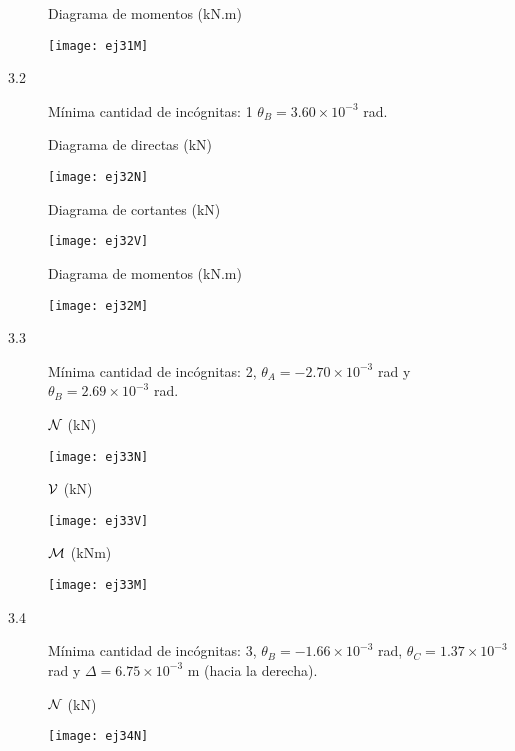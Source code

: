 \begin{description}
Diagrama de momentos (kN.m)

	\begin{center}
	\texttt{[image: ej31M]}
\end{center}

\item[3.2]
Mínima cantidad de incógnitas: 1 $\theta_B = 3.60 \times 10^{-3}$ rad.

Diagrama de directas (kN)

	\begin{center}
	\texttt{[image: ej32N]}
\end{center}

Diagrama de cortantes (kN)

	\begin{center}
	\texttt{[image: ej32V]}
\end{center}

Diagrama de momentos (kN.m)

	\begin{center}
	\texttt{[image: ej32M]}
\end{center}

\item [3.3]

Mínima cantidad de incógnitas: 2, $\theta_A = -2.70 \times 10^{-3}$ rad y $\theta_B = 2.69 \times 10^{-3}$ rad.

${\mathcal N}$ (kN)

	\begin{center}
	\texttt{[image: ej33N]}
\end{center}

${\mathcal V}$ (kN)

	\begin{center}
	\texttt{[image: ej33V]}
\end{center}

${\mathcal M}$ (kNm)

	\begin{center}
	\texttt{[image: ej33M]}
\end{center}

\item[3.4]
Mínima cantidad de incógnitas: 3, $\theta_B = -1.66 \times 10^{-3}$ rad, $\theta_C = 1.37 \times 10^{-3}$ rad y $\Delta = 6.75 \times 10^{-3}$ m (hacia la derecha).


${\mathcal N}$ (kN)

\begin{center}
	\texttt{[image: ej34N]}
\end{center}


\end{description}
